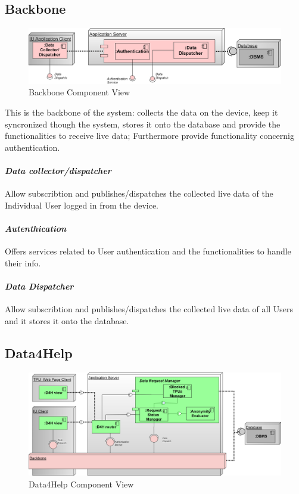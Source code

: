 \subsection{Backbone}
\label{subsect:backboneComponentView}
\begin{figure}[H]
\caption{Backbone Component View}
\includegraphics[width = \textwidth]{sections/architecturalDesign/BackboneDiagram.png}
\end{figure}
This is the backbone of the system: collects the data on the device, keep it syncronized though the system, stores it onto the database and provide the functionalities to receive live data; Furthermore provide functionality concernig authentication.
\paragraph{\textit{Data collector/dispatcher}} Allow subscribtion and publishes/dispatches the collected live data of the Individual User logged in from the device. 
\paragraph{\textit{Autenthication}} Offers services related to User authentication and the functionalities to handle their info.
\paragraph{\textit{Data Dispatcher}} Allow subscribtion and publishes/dispatches the collected live data of all Users and it stores it onto the database.
\clearpage
\subsection{Data4Help}
\label{subsect:D4HComponentView}
\begin{figure}[H]
\caption{Data4Help Component View}
\includegraphics[width = \textwidth]{sections/architecturalDesign/D4HDiagram.png}
\end{figure}
